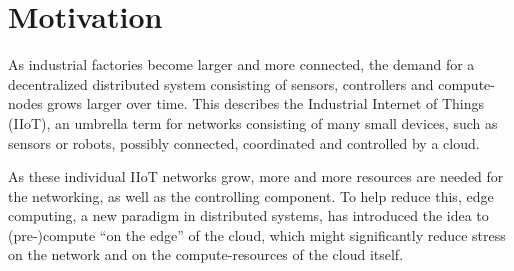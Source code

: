 \section{Motivation}

As industrial factories become larger and more connected, the demand for a
decentralized distributed system consisting of sensors, controllers and
compute-nodes grows larger over time. This describes the Industrial Internet of
Things (IIoT), an umbrella term for networks consisting of many small devices,
such as sensors or robots, possibly connected, coordinated and controlled by a
cloud.

As these individual IIoT networks grow, more and more resources are needed for
the networking, as well as the controlling component. To help reduce this, edge
computing, a new paradigm in distributed systems, has introduced the idea to
(pre-)compute \enquote{on the edge} of the cloud, which might significantly
reduce stress on the network and on the compute-resources of the cloud itself.

